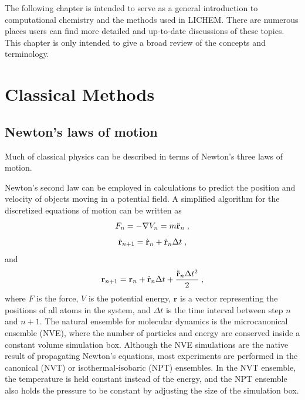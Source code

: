 \documentclass[12pt]{report}
\begin{document}
The following chapter is intended to serve as a general introduction to
computational chemistry and the methods used in LICHEM.
There are numerous places users can find more detailed and up-to-date
discussions of these topics.
This chapter is only intended to give a broad review of the concepts and
terminology.

\section{Classical Methods}

\subsection{Newton's laws of motion}

Much of classical physics can be described in terms of Newton's three laws of
motion.
\begin{quote}
\end{quote}
Newton's second law can be employed in calculations to predict the position
and velocity of objects moving in a potential field.
A simplified algorithm for the discretized equations of motion can be written
as
\begin{equation}
 F_{n} = -\nabla V_{n} = m\ddot {\textbf r}_{n} \; ,
\end{equation}
\begin{equation}
 \dot {\textbf r}_{n+1} = \dot {\textbf r}_{n}+\ddot {\textbf r}_{n}
 \Delta t \; ,
\end{equation}
and
\begin{equation}
 {\textbf r}_{n+1} = {\textbf r}_{n}+\dot {\textbf r}_{n}\Delta t
 +\frac{\ddot {\textbf r}_{n}\Delta t^2}{2} \; ,
\end{equation}
where $F$ is the force, $V$ is the potential energy, $\textbf{r}$ is a vector
representing the positions of all atoms in the system, and $\Delta t$ is the
time interval between step $n$ and $n+1$.
The natural ensemble for molecular dynamics is the microcanonical ensemble
(NVE), where the number of particles and energy are conserved inside a
constant volume simulation box.
Although the NVE simulations are the native result of propagating Newton's
equations, most experiments are performed in the canonical (NVT) or
isothermal-isobaric (NPT) ensembles.
In the NVT ensemble, the temperature is held constant instead of the energy,
and the NPT ensemble also holds the pressure to be constant by adjusting the
size of the simulation box.
\end{document}
